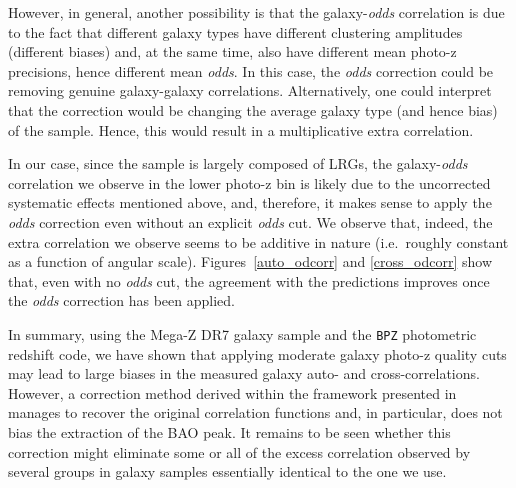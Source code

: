 However, in general, another possibility is that the galaxy-{\em odds} correlation is due to the
fact that different galaxy types have different clustering amplitudes
(different biases) and, at the same time, also have different mean
photo-z precisions, hence different mean {\em odds}. 
In this case, the {\em odds} correction could be removing genuine
galaxy-galaxy correlations. Alternatively, one could interpret that
the correction would be changing the average galaxy
type (and hence bias) of the sample. Hence, this would result in a
multiplicative extra correlation.

In our case, since the sample is largely composed of LRGs, the
galaxy-{\em odds}  correlation we observe in the lower photo-z bin is likely 
due to the uncorrected systematic effects mentioned above, and,
therefore, it makes sense to apply the {\em odds} correction even without an
explicit {\em odds} cut. We observe that, indeed, the extra
correlation we observe seems to be additive in nature (i.e.~roughly
constant as a function of angular scale).
Figures~\ref{auto_odcorr} and \ref{cross_odcorr} show that, even with
no {\em odds} cut, the agreement
with the predictions improves once the {\em odds} correction
has been applied.

\vspace*{1em}

In summary, using the Mega-Z DR7 galaxy sample and the {\tt BPZ}
photometric redshift code,
we have shown that applying moderate galaxy photo-z quality cuts
may lead to large biases in the measured galaxy auto- and cross-correlations.
However, a correction method
derived within the framework presented in~\citet{Ho2012, Ross2011}
manages to recover the original correlation functions and,
in particular, does not bias the extraction of the BAO peak. It
remains to be seen whether this correction might eliminate some or
all of the excess correlation observed by several groups in galaxy
samples essentially identical to the one we use.
